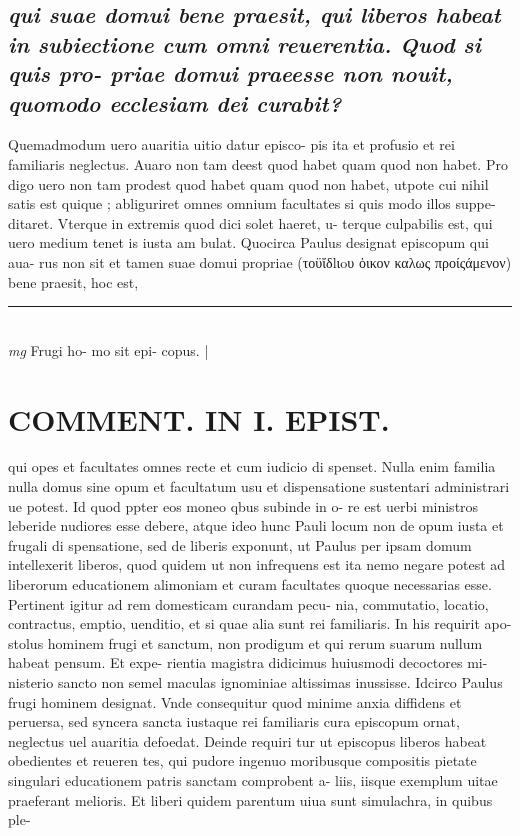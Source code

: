 \documentclass{article}
\begin{document}
\begin{pages}
\subsection*{\textit{qui suae domui bene praesit, qui liberos habeat in subiectione cum omni reuerentia. Quod si quis pro- priae domui praeesse non nouit, quomodo ecclesiam dei curabit? }}\pstart Quemadmodum uero auaritia uitio datur episco- pis ita et profusio et rei familiaris neglectus. Auaro non tam deest quod habet quam quod non habet. Pro digo uero non tam prodest quod habet quam quod non habet, utpote cui nihil satis est quique ; abliguriret omnes omnium facultates si quis modo illos suppe- ditaret. Vterque in extremis quod dici solet haeret, u- terque culpabilis est, qui uero medium tenet is iusta am bulat. Quocirca Paulus designat episcopum qui aua- rus non sit et tamen suae domui propriae (τοϋἴδlιoυ ὁικον καλως προίςάμενον) bene praesit, hoc est,  \pend
\vspace{0.5cm}\noindent
\vspace{0.2cm}\rule{1cm}{0.2pt}\\ 
\hspace{0.2cm}\textit{mg}
\footnotesize Frugi ho- mo sit epi- copus. 
\normalsize| 
\section*{COMMENT. IN I. EPIST. }\pstart qui opes et facultates omnes recte et cum iudicio di spenset. Nulla enim familia nulla domus sine opum et facultatum usu et dispensatione sustentari administrari ue potest. Id quod ppter eos moneo qbus subinde in o- re est uerbi ministros leberide nudiores esse debere, atque ideo hunc Pauli locum non de opum iusta et frugali di spensatione, sed de liberis exponunt, ut Paulus per ipsam domum intellexerit liberos, quod quidem ut non infrequens est ita nemo negare potest ad liberorum educationem alimoniam et curam facultates quoque necessarias esse. Pertinent igitur ad rem domesticam curandam pecu- nia, commutatio, locatio, contractus, emptio, uenditio, et si quae alia sunt rei familiaris. In his requirit apo- stolus hominem frugi et sanctum, non prodigum et qui rerum suarum nullum habeat pensum. Et expe- rientia magistra didicimus huiusmodi decoctores mi- nisterio sancto non semel maculas ignominiae altissimas inussisse. Idcirco Paulus frugi hominem designat. Vnde consequitur quod minime anxia diffidens et peruersa, sed syncera sancta iustaque rei familiaris cura episcopum ornat, neglectus uel auaritia defoedat. Deinde requiri tur ut episcopus liberos habeat obedientes et reueren tes, qui pudore ingenuo moribusque compositis pietate singulari educationem patris sanctam comprobent a- liis, iisque exemplum uitae praeferant melioris. Et liberi quidem parentum uiua sunt simulachra, in quibus ple-  \pend

\end{pages}
\end{document}
